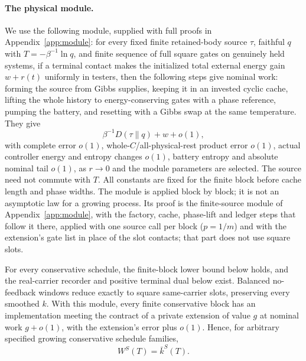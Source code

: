 \paragraph{The physical module.}
We use the following module, supplied with full proofs in Appendix~\ref{app:module}: for every fixed finite retained-body source $\tau$, faithful $q$ with $T=-\beta^{-1}\ln q$, and finite sequence of full square gates on genuinely held systems, if a terminal contact makes the initialized total external energy gain $w+r(t)$ uniformly in testers, then the following steps give nominal work: forming the source from Gibbs supplies, keeping it in an invested cyclic cache, lifting the whole history to energy-conserving gates with a phase reference, pumping the battery, and resetting with a Gibbs swap at the same temperature. They give
\[
\beta^{-1}D(\tau\|q)+w+o(1),
\]
with complete error $o(1)$, whole-$C$/all-physical-rest product error $o(1)$, actual controller energy and entropy changes $o(1)$, battery entropy and absolute nominal tail $o(1)$, as $r\to0$ and the module parameters are selected. The source need not commute with $T$. All constants are fixed for the finite block before cache length and phase widths. The module is applied block by block; it is not an asymptotic law for a growing process. Its proof is the finite-source module of Appendix~\ref{app:module}, with the factory, cache, phase-lift and ledger steps that follow it there, applied with one source call per block ($p=1/m$) and with the extension's gate list in place of the slot contacts; that part does not use square slots.

\begin{theorem}\label{to:sc-thm:scope}
For every conservative schedule, the finite-block lower bound below holds, and the real-carrier recorder and positive terminal dual below exist. Balanced no-feedback windows reduce exactly to square same-carrier slots, preserving every smoothed $k$. With this module, every finite conservative block has an implementation meeting the contract of a private extension of value $g$ at nominal work $g+o(1)$, with the extension's error plus $o(1)$. Hence, for arbitrary specified growing conservative schedule families,
\[
W^S(T)=\bar k^S(T).
\]
\end{theorem}

